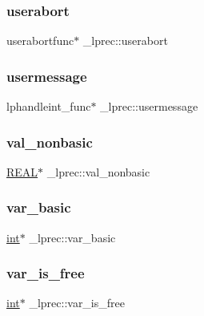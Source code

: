 \subsubsection{\texorpdfstring{userabort}{userabort}}
{\footnotesize\ttfamily userabortfunc$\ast$ \+\_\+lprec\+::userabort}

\mbox{\label{struct__lprec_a008c171a59c434419f9bfa86536810ec}} 
\subsubsection{\texorpdfstring{usermessage}{usermessage}}
{\footnotesize\ttfamily lphandleint\+\_\+func$\ast$ \+\_\+lprec\+::usermessage}

\mbox{\label{struct__lprec_ac833bc75add6b241d6eedd68d242b9cf}} 
\subsubsection{\texorpdfstring{val\+\_\+nonbasic}{val\_nonbasic}}
{\footnotesize\ttfamily \hyperlink{lp__lib_8h_a92bd5e363d131fa73669358edb232dce}{R\+E\+AL}$\ast$ \+\_\+lprec\+::val\+\_\+nonbasic}

\mbox{\label{struct__lprec_aaaed179854dbfd29f3b28b1b18837c33}} 
\subsubsection{\texorpdfstring{var\+\_\+basic}{var\_basic}}
{\footnotesize\ttfamily \hyperlink{lp__lib_8h_adeb9ec6400320e4923ac9d836d509ddb}{int}$\ast$ \+\_\+lprec\+::var\+\_\+basic}

\mbox{\label{struct__lprec_ad3c0f8de4cfa97ea3504770eac89cf35}} 
\subsubsection{\texorpdfstring{var\+\_\+is\+\_\+free}{var\_is\_free}}
{\footnotesize\ttfamily \hyperlink{lp__lib_8h_adeb9ec6400320e4923ac9d836d509ddb}{int}$\ast$ \+\_\+lprec\+::var\+\_\+is\+\_\+free}

